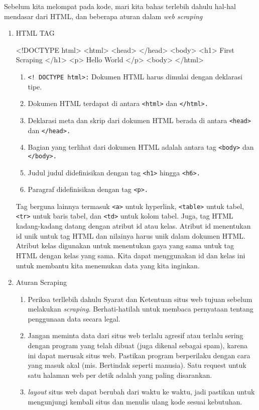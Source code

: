 Sebelum kita melompat pada kode, mari kita bahas terlebih dahulu hal-hal mendasar dari HTML, dan beberapa aturan dalam \textit{web scraping}
\begin{enumerate}
\item HTML TAG
\begin{algorithm}
<!DOCTYPE html>  
<html>  
    <head>
    </head>
    <body>
        <h1> First Scraping </h1>
        <p> Hello World </p>
    <body>
</html>
\end{algorithm}
\begin{enumerate}

\item \verb|<! DOCTYPE html>:| Dokumen HTML harus dimulai dengan deklarasi tipe.
\item Dokumen HTML terdapat di antara \verb|<html>| dan \verb|</html>.|
\item Deklarasi meta dan skrip dari dokumen HTML berada di antara \verb|<head>| dan \verb|</head>.|
\item Bagian yang terlihat dari dokumen HTML adalah antara tag \verb|<body>| dan \verb|</body>.|
\item Judul judul didefinisikan dengan tag \verb|<h1>| hingga \verb|<h6>.|
\item Paragraf didefinisikan dengan tag \verb|<p>.|
\end{enumerate}

Tag berguna lainnya termasuk \verb|<a>| untuk hyperlink, \verb|<table>| untuk tabel, \verb|<tr>| untuk baris tabel, dan \verb|<td>| untuk kolom tabel. Juga, tag HTML kadang-kadang datang dengan atribut id atau kelas. Atribut id menentukan id unik untuk tag HTML dan nilainya harus unik dalam dokumen HTML. Atribut kelas digunakan untuk menentukan gaya yang sama untuk tag HTML dengan kelas yang sama. Kita dapat menggunakan id dan kelas ini untuk membantu kita menemukan data yang kita inginkan.

\item{Aturan Scraping}
\begin{enumerate}
\item Periksa terllebih dahulu Syarat dan Ketentuan situs web tujuan sebelum melakukan \textit{scraping}. Berhati-hatilah untuk membaca pernyataan tentang penggunaan data secara legal. 
\item Jangan meminta data dari situs web terlalu agresif atau terlalu sering dengan program yang telah dibuat (juga dikenal sebagai spam), karena ini dapat merusak situs web. Pastikan program berperilaku dengan cara yang masuk akal (mis. Bertindak seperti manusia). Satu request untuk satu halaman web per detik adalah yang paling disarankan.
\item \textit{layout} situs web dapat berubah dari waktu ke waktu, jadi pastikan untuk mengunjungi kembali situs dan menulis ulang kode sesuai kebutuhan.
\end{enumerate}
\end{enumerate}

